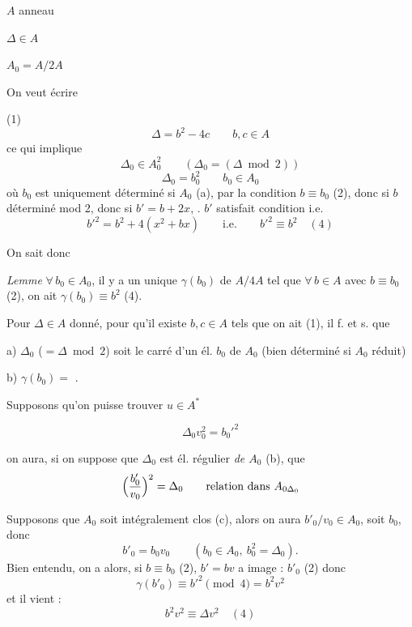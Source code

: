 \documentclass[11pt,a4paper]{article}
\begin{document}

$A$ anneau

$\Delta \in A$

$A_0 = A / 2A$

On veut écrire

(1)
\[
  \Delta = b^2 - 4c \qquad b, c \in A
\]
ce qui implique
\[
  \Delta_0 \in A_0^2 \qquad (\Delta_0 = (\Delta \bmod 2))
\]
\[
  \Delta_0 = b_0^2 \qquad b_0 \in A_0
\]
où $b_0$ est uniquement déterminé si $A_0$  (a), par la condition $b \equiv b_0$ (2), donc si \ill{} $b$ déterminé mod 2, donc si $b' = b + 2x$, \ill{}. $b'$ satisfait   condition i.e.
\[
  b'^2 = b^2 + 4(x^2 + bx) \qquad \text{i.e.} \qquad b'^2 \equiv b^2 \quad (4)
\]

On sait donc

\emph{Lemme} $\forall\, b_0 \in A_0$, il y a un unique  $\gamma(b_0)$ de $A/4A$ tel que $\forall\, b \in A$ \struck{\ill{}} avec $b \equiv b_0$ (2), on ait $\gamma(b_0) \equiv b^2$ (4).

Pour $\Delta \in A$ donné, pour qu'il existe $b, c \in A$ tels que on ait (1), il f. et s. que

a) $\Delta_0$ ($= \Delta \bmod 2$) soit le carré d'un él. $b_0$ de $A_0$ (bien déterminé si $A_0$ réduit)

b) $\gamma(b_0) =$ \uncertain{$\Delta$}.

Supposons qu'on puisse trouver  $u \in A^*$ \struck{\ill{}} 



\[
  \Delta_0 v_0^2 = b_0'^2
\]

on aura, si on suppose que $\Delta_0$ est él. régulier \emph{de $A_0$} (b), que
\[
  \Bigl(\frac{b'_0}{v_0}\Bigr)^2 = \Delta_0 \qquad \text{relation dans } A_{0\Delta_0}
\]

Supposons que $A_0$ soit intégralement clos (c), alors on aura $b'_0 / v_0 \in A_0$, soit $b_0$, donc
\[
  b'_0 = b_0 v_0 \qquad (b_0 \in A_0,\ b_0^2 = \Delta_0) .
\]
 Bien entendu, on a alors, si $b \equiv b_0$ (2), $b' = bv$ a  image : $b'_0$ (2) donc
\[
  \gamma(b'_0) \equiv b'^2 \pmod 4 = b^2 v^2
\]
et il vient : 
\[
  b^2 v^2 \equiv \Delta v^2 \quad (4)
\]
\end{document}
